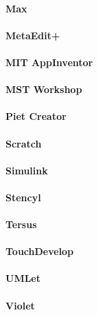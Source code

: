 \paragraph{Max}

\paragraph{MetaEdit+}

\paragraph{MIT AppInventor}

\paragraph{MST Workshop}

\paragraph{Piet Creator}

\paragraph{Scratch}

\paragraph{Simulink}

\paragraph{Stencyl}

\paragraph{Tersus}

\paragraph{TouchDevelop}

\paragraph{UMLet}

\paragraph{Violet}

